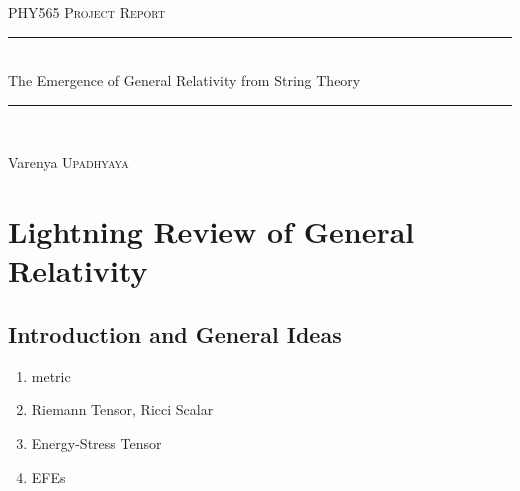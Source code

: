 \documentclass{article}
\newcommand{\HRule}{\rule{\linewidth}{0.3mm}} %
\begin{document}
{}

\begin{center}
    
\textsc{\Large PHY565 Project Report}\\[0.3cm] %

\HRule \\[0.4cm]
    { \huge The Emergence of General Relativity from String Theory\\}
\HRule \\
\begin{flushright}
    Varenya \textsc{Upadhyaya}\\[1cm] %

\end{flushright}
\end{center} %

\section{Lightning Review of General Relativity}
\subsection{Introduction and General Ideas}
\begin{enumerate}
    \item metric
    \item Riemann Tensor, Ricci Scalar
    \item Energy-Stress Tensor
    \item EFEs
\end{enumerate}
\end{document}
